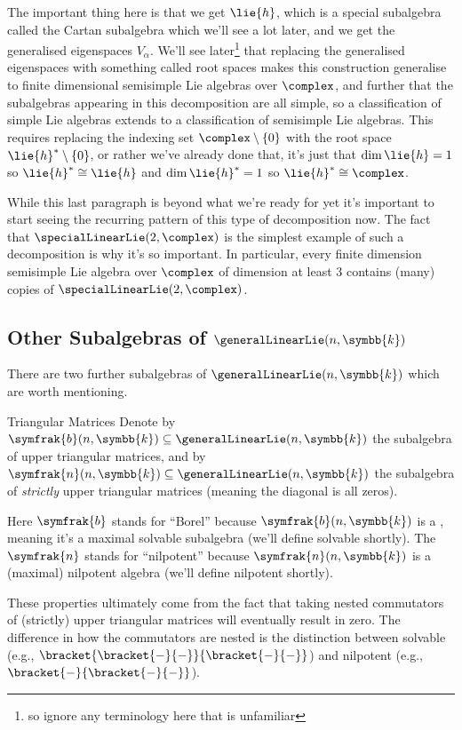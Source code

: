 \documentclass[fleqn]{NotesClass}
\renewcommand{\field}{\symbb{k}}
\newcommand{\isomorphic}{\cong}
\newcommand{\borelLie}{\symfrak{b}}
\newcommand{\nilpotentLie}{\symfrak{n}}
\begin{document}
    The important thing here is that we get \(\lie{h}\), which is a special subalgebra called the Cartan subalgebra which we'll see a lot later, and we get the generalised eigenspaces \(V_{\alpha}\).
    We'll see later\footnote{so ignore any terminology here that is unfamiliar} that replacing the generalised eigenspaces with something called root spaces makes this construction generalise to finite dimensional semisimple Lie algebras over \(\complex\), and further that the subalgebras appearing in this decomposition are all simple, so a classification of simple Lie algebras extends to a classification of semisimple Lie algebras.
    This requires replacing the indexing set \(\complex \setminus \{0\}\) with the root space \(\lie{h}^* \setminus \{0\}\), or rather we've already done that, it's just that \(\dim \lie{h} = 1\) so \(\lie{h}^* \isomorphic \lie{h}\) and \(\dim \lie{h}^* = 1\) so \(\lie{h}^* \isomorphic \complex\). %
    
    While this last paragraph is beyond what we're ready for yet it's important to start seeing the recurring pattern of this type of decomposition now.
    The fact that \(\specialLinearLie(2, \complex)\) is the simplest example of such a decomposition is why it's so important.
    In particular, every finite dimension semisimple Lie algebra over \(\complex\) of dimension at least 3 contains (many) copies of \(\specialLinearLie(2, \complex)\).
    
    \subsection{Other Subalgebras of \texorpdfstring{\(\generalLinearLie(n, \field)\)}{gl(n, k)}}
    There are two further subalgebras of \(\generalLinearLie(n, \field)\) which are worth mentioning.
    \begin{dfn}{Triangular Matrices}{}
        Denote by \(\borelLie(n, \field) \subseteq \generalLinearLie(n, \field)\) the subalgebra of upper triangular matrices, and by \(\nilpotentLie(n, \field) \subseteq \generalLinearLie(n, \field)\) the subalgebra of \emph{strictly} upper triangular matrices (meaning the diagonal is all zeros).
    \end{dfn}
    
    \begin{remark}{}{}
        Here \(\borelLie\) stands for \enquote{Borel} because \(\borelLie(n, \field)\) is a , meaning it's a maximal solvable subalgebra (we'll define solvable shortly). %
        The \(\nilpotentLie\) stands for \enquote{nilpotent} because \(\nilpotentLie(n, \field)\) is a (maximal) nilpotent algebra (we'll define nilpotent shortly). %
        
        These properties ultimately come from the fact that taking nested commutators of (strictly) upper triangular matrices will eventually result in zero.
        The difference in how the commutators are nested is the distinction between solvable (e.g., \(\bracket{\bracket{-}{-}}{\bracket{-}{-}}\)) and nilpotent (e.g., \(\bracket{-}{\bracket{-}{-}}\)).
    \end{remark}
    
\end{document}
